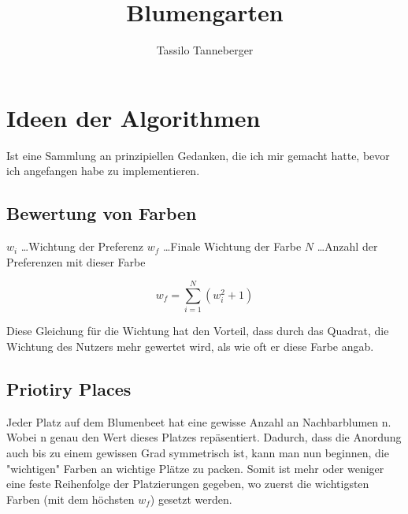 \documentclass{article}
\begin{document}
\title{Blumengarten}
\author{Tassilo Tanneberger}

\maketitle

\section{Ideen der Algorithmen}
Ist eine Sammlung an prinzipiellen Gedanken, die ich mir gemacht hatte, bevor ich angefangen habe zu implementieren.
\subsection{Bewertung von Farben}
 
\(w_i\) \dots  	Wichtung der Preferenz \newline
\(w_f\) \dots 	Finale Wichtung der Farbe \newline
\(N\) \dots    	Anzahl der Preferenzen mit dieser Farbe

\begin{equation}
w_f =  \sum \limits_{i=1}^N  (w_i^2 + 1)
\end{equation}

Diese Gleichung für die Wichtung hat den Vorteil, dass durch das Quadrat, die Wichtung des Nutzers mehr gewertet wird, als wie oft er diese Farbe angab.

\subsection{Priotiry Places}

Jeder Platz auf dem Blumenbeet hat eine gewisse Anzahl an Nachbarblumen n. Wobei n genau den Wert dieses Platzes repäsentiert. Dadurch, dass die Anordung auch bis zu einem gewissen Grad symmetrisch ist, kann  man nun beginnen, die "wichtigen" Farben an wichtige Plätze zu packen. Somit ist mehr oder weniger eine feste Reihenfolge der Platzierungen gegeben, wo zuerst die wichtigsten Farben (mit dem höchsten \(w_f\)) gesetzt werden.
\end{document}
